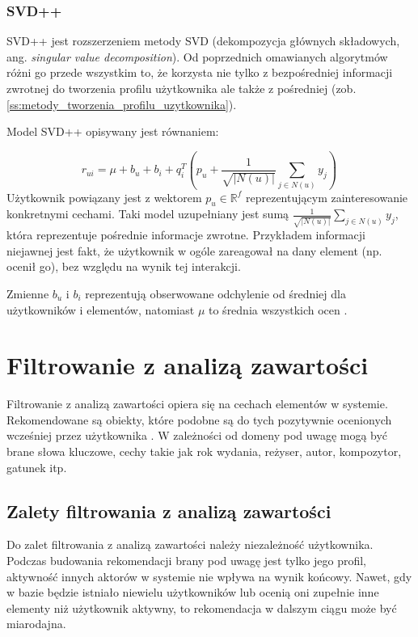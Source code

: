 \documentclass[twoside]{iisthesis}
\begin{document}
	 \subsubsection{SVD++}
	 
	 SVD++ jest rozszerzeniem metody SVD (dekompozycja głównych składowych, ang. \textit{singular value decomposition}). Od poprzednich omawianych algorytmów różni go przede wszystkim to, że korzysta nie tylko z bezpośredniej informacji zwrotnej do tworzenia profilu użytkownika ale także z pośredniej (zob. \ref{ss:metody_tworzenia_profilu_uzytkownika}).
	 
	 Model SVD++ opisywany jest równaniem:
	 
	 \begin{equation}
	 \label{eq:svd}
	 r_{ui} = \mu + b_u + b_i + q_i^T (p_u + \frac{1}{\sqrt{|N(u)|}} \sum_{j \in N(u)}^{} y_j) 
	 \,
	 \end{equation}		 		 
	 Użytkownik powiązany jest z wektorem $p_u \in \mathbb{R} ^f$ reprezentującym zainteresowanie konkretnymi cechami. Taki model uzupełniany jest sumą  $\frac{1}{\sqrt{|N(u)|}} \sum_{j \in N(u)}^{} y_j$, która reprezentuje pośrednie informacje zwrotne. Przykładem informacji niejawnej jest fakt, że użytkownik w ogóle zareagował na dany element (np. ocenił go), bez względu na wynik tej interakcji. 
	 
	 Zmienne $b_u$ i $b_i$ reprezentują obserwowane odchylenie od średniej dla użytkowników i elementów, natomiast $\mu$ to średnia wszystkich ocen \cite{koren2008factorization}. 
	 
	 \section{Filtrowanie z analizą zawartości}
	 
	 Filtrowanie z analizą zawartości opiera się na cechach elementów w systemie. Rekomendowane są obiekty, które podobne są do tych pozytywnie ocenionych wcześniej przez użytkownika \cite{id:huynh2012modeling}. W zależności od domeny pod uwagę mogą być brane słowa kluczowe, cechy takie jak rok wydania, reżyser, autor, kompozytor, gatunek itp.
	 
	 \subsection{Zalety filtrowania z analizą zawartości}
	 
	 Do zalet filtrowania z analizą zawartości należy niezależność użytkownika. Podczas budowania rekomendacji brany pod uwagę jest tylko jego profil, aktywność innych aktorów w systemie nie wpływa na wynik końcowy. Nawet, gdy w bazie będzie istniało niewielu użytkowników lub ocenią oni zupełnie inne elementy niż użytkownik aktywny, to rekomendacja w dalszym ciągu może być miarodajna. 
	 
\end{document}
